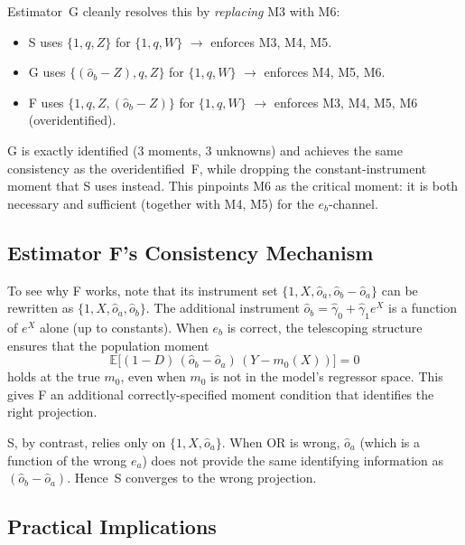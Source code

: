 \documentclass[11pt,letterpaper]{article}
\newcommand{\E}{\mathbb{E}}
\begin{document}
\medskip\noindent
Estimator~G cleanly resolves this by \emph{replacing} M3 with M6:
\begin{itemize}[nosep]
  \item S uses $\{1, q, Z\}$ for $\{1, q, W\}$ $\to$ enforces M3, M4, M5.
  \item G uses $\{(\hat{o}_b - Z), q, Z\}$ for $\{1, q, W\}$
    $\to$ enforces M4, M5, M6.
  \item F uses $\{1, q, Z, (\hat{o}_b - Z)\}$ for $\{1, q, W\}$
    $\to$ enforces M3, M4, M5, M6 (overidentified).
\end{itemize}
G is exactly identified (3 moments, 3 unknowns) and achieves the
same consistency as the overidentified~F, while dropping the
constant-instrument moment that S uses instead.  This pinpoints
M6 as the critical moment: it is both necessary and sufficient
(together with M4, M5) for the $e_b$-channel.


\subsection{Estimator F's Consistency Mechanism}

To see why F works, note that its instrument set
$\{1, X, \hat{o}_a, \hat{o}_b - \hat{o}_a\}$ can be rewritten as
$\{1, X, \hat{o}_a, \hat{o}_b\}$.  The additional instrument
$\hat{o}_b = \hat\gamma_0 + \hat\gamma_1 e^X$ is a function of
$e^X$ alone (up to constants).  When $e_b$ is correct, the
telescoping structure ensures that the population moment
\[
  \E\bigl[(1-D)\,(\hat{o}_b - \hat{o}_a)\,(Y - m_0(X))\bigr] = 0
\]
holds at the true $m_0$, even when $m_0$ is not in the model's
regressor space.  This gives F an additional correctly-specified
moment condition that identifies the right projection.

S, by contrast, relies only on $\{1, X, \hat{o}_a\}$.  When OR
is wrong, $\hat{o}_a$ (which is a function of the wrong $e_a$)
does not provide the same identifying information as
$(\hat{o}_b - \hat{o}_a)$.  Hence~S converges to the wrong
projection.


\subsection{Practical Implications}
\end{document}

